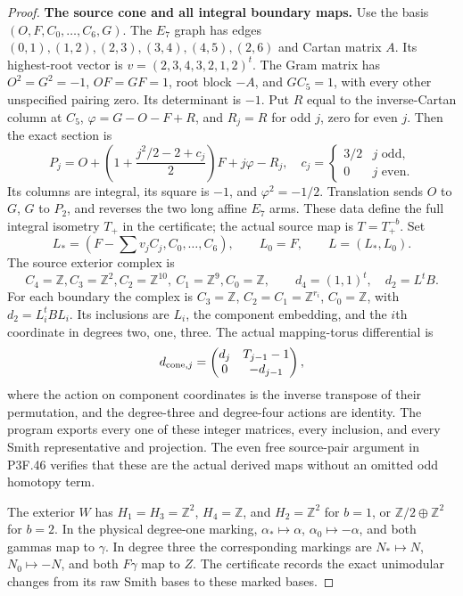 \begin{proof}
\par\medskip\noindent\textbf{The source cone and all integral boundary maps.}\enspace
Use the basis $(O,F,C_0,\ldots,C_6,G)$.
The $E_7$ graph has edges
$(0,1),(1,2),(2,3),(3,4),(4,5),(2,6)$ and Cartan matrix $A$.
Its highest-root vector is $v=(2,3,4,3,2,1,2)^t$.
The Gram matrix has $O^2=G^2=-1$, $OF=GF=1$,
root block $-A$, and $G C_5=1$, with every other unspecified
pairing zero. Its determinant is $-1$.
Put $R$ equal to the inverse-Cartan column at $C_5$,
$\varphi=G-O-F+R$, and $R_j=R$ for odd $j$, zero for even $j$.
Then the exact section is
\[
 P_j=O+\left(1+\frac{j^2/2-2+c_j}{2}\right)F
                 +j\varphi-R_j,\quad
 c_j=\begin{cases}3/2&j\text{ odd},\\0&j\text{ even}.
 \end{cases}                                         \tag{F47.10}
\]
Its columns are integral, its square is $-1$, and
$\varphi^2=-1/2$. Translation sends $O$ to $G$, $G$ to $P_2$,
and reverses the two long affine $E_7$ arms. These data define
the full integral isometry $T_+$ in the certificate;
the actual source map is $T=T_+^{-b}$.
Set
\[
 L_*=(F-\sum v_jC_j,C_0,\ldots,C_6),\qquad L_0=F,
 \qquad L=(L_*,L_0).
\]
The source exterior complex is
\[
 C_4=\mathbb Z, C_3=\mathbb Z^2, C_2=\mathbb Z^{10},
 \ C_1=\mathbb Z^9, C_0=\mathbb Z,\qquad
 d_4=(1,1)^t,\quad d_2=L^tB.                         \tag{F47.11}
\]
For each boundary the complex is
$C_3=\mathbb Z$, $C_2=C_1=\mathbb Z^{r_i}$, $C_0=\mathbb Z$,
with $d_2=L_i^tBL_i$. Its inclusions are $L_i$, the component
embedding, and the $i$th coordinate in degrees two, one, three.
The actual mapping-torus differential is
\[
 d_{{\rm cone},j}
       =\begin{pmatrix}d_j&T_{j-1}-1\\0&-d_{j-1}\end{pmatrix},
\]
where the action on component coordinates is the inverse
transpose of their permutation, and the degree-three and
degree-four actions are identity. The program exports every
one of these integer matrices, every inclusion, and every
Smith representative and projection. The even free source-pair
argument in P3F.46 verifies that these are the actual derived
maps without an omitted odd homotopy term.

The exterior $W$ has $H_1=H_3=\mathbb Z^2$, $H_4=\mathbb Z$,
and $H_2=\mathbb Z^2$ for $b=1$, or $\mathbb Z/2\oplus\mathbb Z^2$
for $b=2$. In the physical degree-one marking,
$\alpha_*\mapsto\alpha$, $\alpha_0\mapsto-\alpha$,
and both gammas map to $\gamma$.
In degree three the corresponding markings are
$N_*\mapsto N$, $N_0\mapsto-N$, and both $F\gamma$ map to $Z$.
The certificate records the exact unimodular changes from its
raw Smith bases to these marked bases.


\end{proof}
